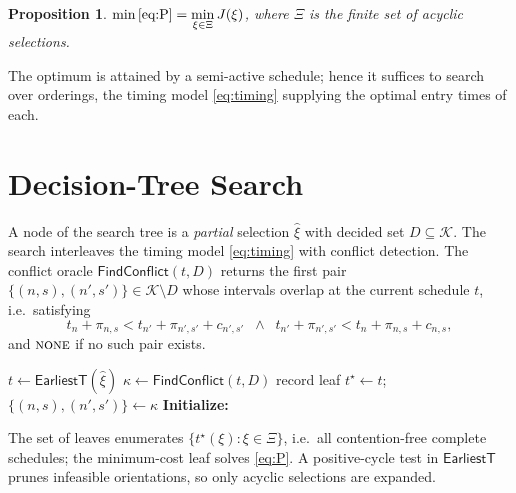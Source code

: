 \documentclass[12pt]{article}
\newtheorem{proposition}{Proposition}
\begin{document}
\begin{proposition}\label{prop:reduce}
$\displaystyle \min\eqref{eq:P}=\min_{\xi\in\Xi}J(\xi)$, where $\Xi$ is the
finite set of acyclic selections.
\end{proposition}

The optimum is attained by a semi-active schedule; hence it suffices to search
over orderings, the timing model \eqref{eq:timing} supplying the optimal entry
times of each.

\section{Decision-Tree Search}\label{sec:tree}

A node of the search tree is a \emph{partial} selection $\hat\xi$ with decided
set $D\subseteq\mathcal{K}$. The search interleaves the timing model
\eqref{eq:timing} with conflict detection. The conflict oracle
$\mathsf{FindConflict}(t,D)$ returns the first pair
$\{(n,s),(n',s')\}\in\mathcal{K}\setminus D$ whose intervals overlap at the
current schedule $t$, i.e.\ satisfying
\begin{equation}\label{eq:overlap}
t_n+\pi_{n,s}<t_{n'}+\pi_{n',s'}+c_{n',s'}
\;\;\wedge\;\;
t_{n'}+\pi_{n',s'}<t_n+\pi_{n,s}+c_{n,s},
\end{equation}
and $\textsc{none}$ if no such pair exists.

\begin{algorithm}[t]
\caption{No-wait enumeration scheduler}\label{alg:tree}
\begin{algorithmic}[1]
  \State $t\gets\mathsf{EarliestT}(\hat\xi)$
   \State \Return
  \EndIf
  \State $\kappa\gets\mathsf{FindConflict}(t,D)$
     \State record leaf $t^\star\gets t$; \Return
  \EndIf
  \State $\{(n,s),(n',s')\}\gets\kappa$
  \State {}
  \State {}
\EndProcedure
\State \textbf{Initialize:} 
\end{algorithmic}
\end{algorithm}

The set of leaves enumerates $\{t^\star(\xi):\xi\in\Xi\}$, i.e.\ all
contention-free complete schedules; the minimum-cost leaf solves \eqref{eq:P}.
A positive-cycle test in $\mathsf{EarliestT}$ prunes infeasible orientations, so
only acyclic selections are expanded.
\end{document}
